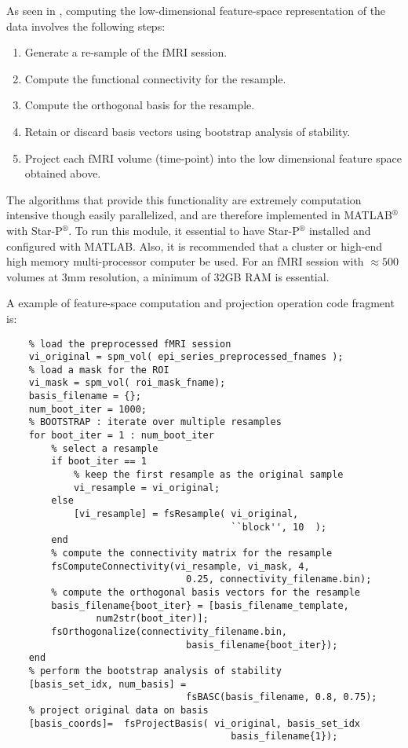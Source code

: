 As seen in , computing the low-dimensional
feature-space representation of the data involves the following
steps:

\begin{enumerate}
  \item Generate a re-sample of the fMRI session.
  \item Compute the functional connectivity for the resample.
  \item Compute the orthogonal basis for the resample.
  \item Retain or discard basis vectors using bootstrap analysis of
  stability\cite{Bellec2010}.
  \item Project each fMRI volume (time-point) into the low
  dimensional feature space obtained above.
\end{enumerate}


The algorithms that provide this functionality are extremely
computation intensive though easily parallelized, and are therefore
implemented in MATLAB$^\circledR$ with Star-P$^\circledR$. To run
this module, it essential to have Star-P$^\circledR$ installed and
configured with MATLAB. Also, it is recommended that a cluster or
high-end high memory multi-processor computer be used. For an fMRI
session with $\approx 500$ volumes at $3$mm resolution, a minimum of
32GB RAM is essential.

A example of feature-space computation and projection operation code
fragment is:
\begin{verbatim}
    % load the preprocessed fMRI session
    vi_original = spm_vol( epi_series_preprocessed_fnames );
    % load a mask for the ROI
    vi_mask = spm_vol( roi_mask_fname);
    basis_filename = {};
    num_boot_iter = 1000;
    % BOOTSTRAP : iterate over multiple resamples
    for boot_iter = 1 : num_boot_iter
        % select a resample
        if boot_iter == 1
            % keep the first resample as the original sample
            vi_resample = vi_original;
        else
            [vi_resample] = fsResample( vi_original,
                                        ``block'', 10  );
        end
        % compute the connectivity matrix for the resample
        fsComputeConnectivity(vi_resample, vi_mask, 4,
                                0.25, connectivity_filename.bin);
        % compute the orthogonal basis vectors for the resample
        basis_filename{boot_iter} = [basis_filename_template,
                num2str(boot_iter)];
        fsOrthogonalize(connectivity_filename.bin,
                                basis_filename{boot_iter});
    end
    % perform the bootstrap analysis of stability
    [basis_set_idx, num_basis] =
                                fsBASC(basis_filename, 0.8, 0.75);
    % project original data on basis
    [basis_coords]=  fsProjectBasis( vi_original, basis_set_idx
                                        basis_filename{1});
\end{verbatim}

